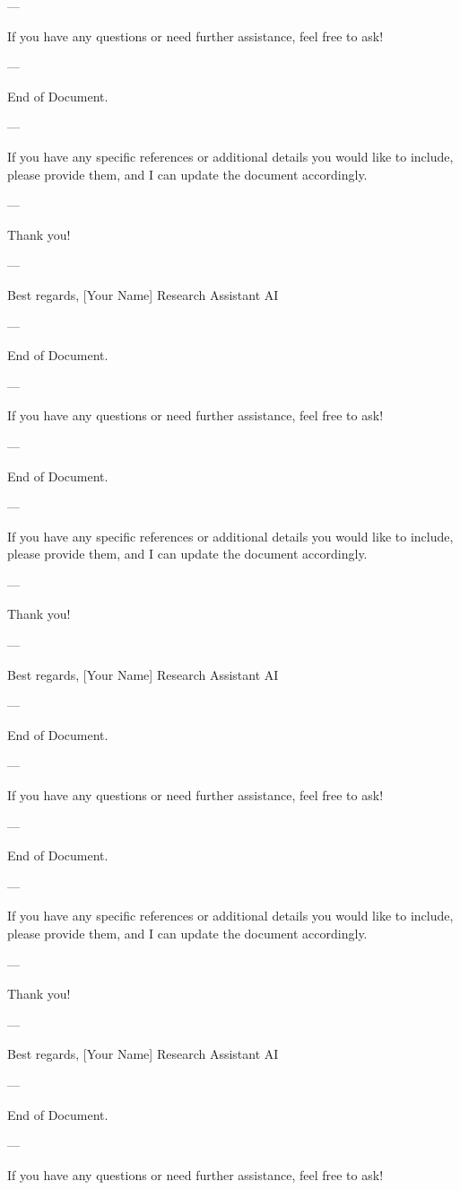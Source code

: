 --- 

If you have any questions or need further assistance, feel free to ask! 

--- 

End of Document. 

--- 

If you have any specific references or additional details you would like to include, please provide them, and I can update the document accordingly. 

--- 

Thank you! 

--- 

Best regards,  
[Your Name]  
Research Assistant AI  

--- 

End of Document. 

--- 

If you have any questions or need further assistance, feel free to ask! 

--- 

End of Document. 

--- 

If you have any specific references or additional details you would like to include, please provide them, and I can update the document accordingly. 

--- 

Thank you! 

--- 

Best regards,  
[Your Name]  
Research Assistant AI  

--- 

End of Document. 

--- 

If you have any questions or need further assistance, feel free to ask! 

--- 

End of Document. 

--- 

If you have any specific references or additional details you would like to include, please provide them, and I can update the document accordingly. 

--- 

Thank you! 

--- 

Best regards,  
[Your Name]  
Research Assistant AI  

--- 

End of Document. 

--- 

If you have any questions or need further assistance, feel free to ask! 

